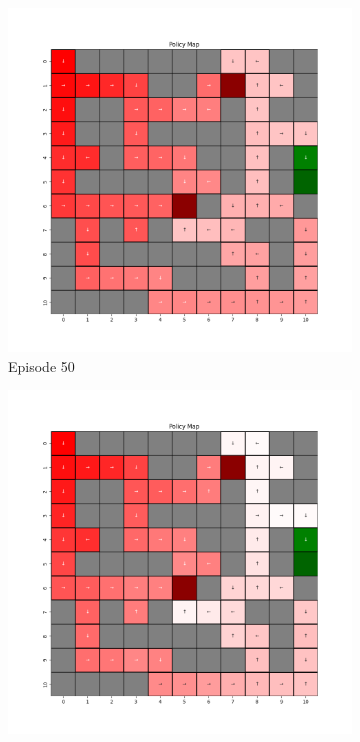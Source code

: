 \documentclass{assignment}
\begin{document}
\begin{figure}[H]
\begin{subfigure}{0.3\textwidth}
        \includegraphics[width=\textwidth]{figures/policy_q/epsilon_sweep/policy_alpha_0.1_gamma_0.95_epsilon_0.8_iteration_50.png}
    \caption{Episode 50}
    \end{subfigure}\hfill
    \begin{subfigure}{0.3\textwidth}
        \includegraphics[width=\textwidth]{figures/policy_q/epsilon_sweep/policy_alpha_0.1_gamma_0.95_epsilon_0.8_iteration_100.png}

\end{subfigure}
\end{figure}
\end{document}
